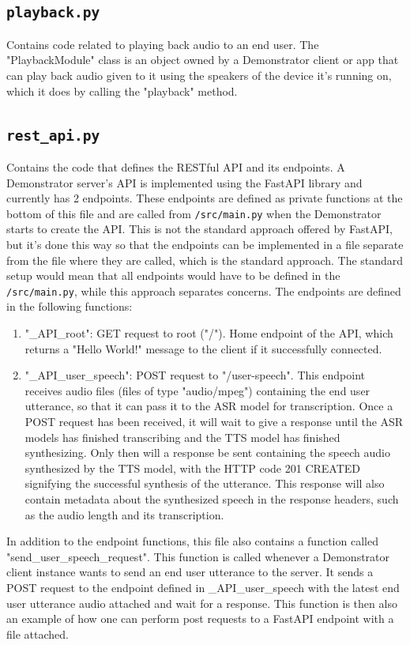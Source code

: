 \subsection{\texttt{playback.py}}
Contains code related to playing back audio to an end user.
The "PlaybackModule" class is an object owned by a Demonstrator client or app that can play back audio given to it using the speakers of the device it's running on, which it does by calling the "playback" method.

\subsection{\texttt{rest\_api.py}}
Contains the code that defines the RESTful API and its endpoints.
A Demonstrator server's API is implemented using the FastAPI library and currently has 2 endpoints.
These endpoints are defined as private functions at the bottom of this file and are called from \texttt{/src/main.py} when the Demonstrator starts to create the API.
This is not the standard approach offered by FastAPI, but it's done this way so that the endpoints can be implemented in a file separate from the file where they are called, which is the standard approach.
The standard setup would mean that all endpoints would have to be defined in the \texttt{/src/main.py}, while this approach separates concerns.
The endpoints are defined in the following functions:
\begin{enumerate}
    \item "\_API\_root": GET request to root ("/"). Home endpoint of the API, which returns a "Hello World!" message to the client if it successfully connected.
    \item "\_API\_user\_speech": POST request to "/user-speech". This endpoint receives audio files (files of type "audio/mpeg") containing the end user utterance, so that it can pass it to the ASR model for transcription.
    Once a POST request has been received, it will wait to give a response until the ASR models has finished transcribing and the TTS model has finished synthesizing.
    Only then will a response be sent containing the speech audio synthesized by the TTS model, with the HTTP code 201 CREATED signifying the successful synthesis of the utterance.
    This response will also contain metadata about the synthesized speech in the response headers, such as the audio length and its transcription.
\end{enumerate}

In addition to the endpoint functions, this file also contains a function called "send\_user\_speech\_request".
This function is called whenever a Demonstrator client instance wants to send an end user utterance to the server.
It sends a POST request to the endpoint defined in \_API\_user\_speech with the latest end user utterance audio attached and wait for a response.
This function is then also an example of how one can perform post requests to a FastAPI endpoint with a file attached.

